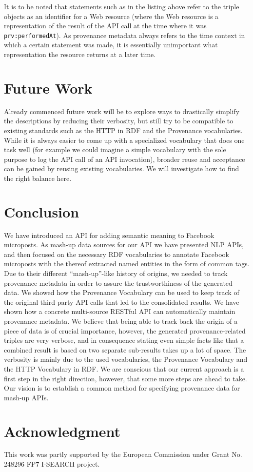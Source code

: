 \documentclass[conference]{IEEEtran}
\begin{document}
It is to be noted that statements such as in the listing above refer to the triple objects as an identifier for a Web resource (where the Web resource is a representation of the result of the API call at the time where it was \texttt{prv:performedAt}). As provenance metadata always refers to the time context in which a certain statement was made, it is essentially unimportant what representation the resource returns at a later time.

\section{Future Work} \label{sec:future}
Already commenced future work will be to explore ways to drastically simplify the descriptions by reducing their verbosity, but still try to be compatible to existing standards such as the HTTP in RDF and the Provenance vocabularies. While it is always easier to come up with a specialized vocabulary that does one task well (for example we could imagine a simple vocabulary with the sole purpose to log the API call of an API invocation), broader reuse and acceptance can be gained by reusing existing vocabularies. We will investigate how to find the right balance here.

\section{Conclusion}                                                        \label{sec:conclusion}
We have introduced an API for adding semantic meaning to Facebook microposts. As mash-up data sources for our API we have presented NLP APIs, and then focused on the necessary RDF vocabularies to annotate Facebook microposts with the thereof extracted named entities in the form of common tags. Due to their different ``mash-up''-like history of origins, we needed to track provenance metadata in order to assure the trustworthiness of the generated data. We showed how the Provenance Vocabulary can be used to keep track of the original third party API calls that led to the consolidated results. We have shown how a concrete multi-source RESTful API can automatically maintain provenance metadata. We believe that being able to track back the origin of a piece of data is of crucial importance, however, the generated provenance-related triples are very verbose, and in consequence stating even simple facts like that a combined result is based on two separate sub-results takes up a lot of space. The verbosity is mainly due to the used vocabularies, the Provenance Vocabulary and the HTTP Vocabulary in RDF. We are conscious that our current approach is a first step in the right direction, however, that some more steps are ahead to take. Our vision is to establish a common method for specifying provenance data for mash-up APIs.

\section*{Acknowledgment}

This work was partly supported by the European Commission under Grant No. 248296 FP7 I-SEARCH project.



\end{document}
